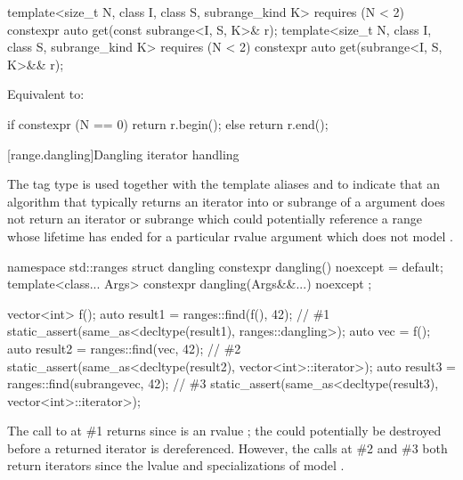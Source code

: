 %
\begin{itemdecl}
template<size_t N, class I, class S, subrange_kind K>
  requires (N < 2)
  constexpr auto get(const subrange<I, S, K>& r);
template<size_t N, class I, class S, subrange_kind K>
  requires (N < 2)
  constexpr auto get(subrange<I, S, K>&& r);
\end{itemdecl}

\begin{itemdescr}
\pnum
\effects
Equivalent to:
\begin{codeblock}
if constexpr (N == 0)
  return r.begin();
else
  return r.end();
\end{codeblock}
\end{itemdescr}

[range.dangling]{Dangling iterator handling}

\pnum
The tag type  is used together
with the template aliases  and 
to indicate that an algorithm
that typically returns an iterator into or subrange of a  argument
does not return an iterator or subrange
which could potentially reference a range
whose lifetime has ended for a particular rvalue  argument
which does not model .
%
\begin{codeblock}
namespace std::ranges {
  struct dangling {
    constexpr dangling() noexcept = default;
    template<class... Args>
      constexpr dangling(Args&&...) noexcept { }
  };
}
\end{codeblock}

\pnum
\begin{example}
\begin{codeblock}
vector<int> f();
auto result1 = ranges::find(f(), 42);                                   // \#1
static_assert(same_as<decltype(result1), ranges::dangling>);
auto vec = f();
auto result2 = ranges::find(vec, 42);                                   // \#2
static_assert(same_as<decltype(result2), vector<int>::iterator>);
auto result3 = ranges::find(subrange{vec}, 42);                         // \#3
static_assert(same_as<decltype(result3), vector<int>::iterator>);
\end{codeblock}
The call to  at \#1 returns 
since  is an rvalue ;
the  could potentially be destroyed
before a returned iterator is dereferenced.
However, the calls at \#2 and \#3 both return iterators
since the lvalue  and specializations of 
model .
\end{example}

